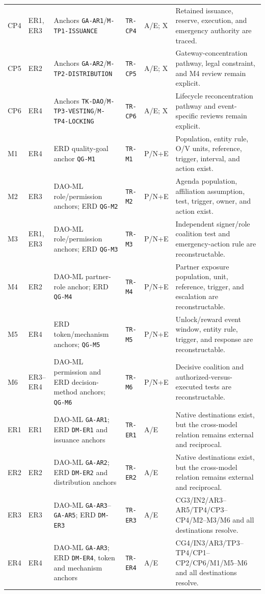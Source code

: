 \documentclass[10pt]{article}
\begin{document}
\begin{landscape}
{\begin{longtable}{@{}p{.035\linewidth}p{.07\linewidth}p{.245\linewidth}p{.105\linewidth}p{.09\linewidth}p{.31\linewidth}@{}}
CP4 & ER1, ER3 & Anchors \texttt{GA-AR1}/\texttt{M-TP1-ISSUANCE} & \texttt{TR-CP4} & A/E; X & Retained issuance, reserve, execution, and emergency authority are traced. \\
CP5 & ER2 & Anchors \texttt{GA-AR2}/\texttt{M-TP2-DISTRIBUTION} & \texttt{TR-CP5} & A/E; X & Gateway-concentration pathway, legal constraint, and M4 review remain explicit. \\
CP6 & ER4 & Anchors \texttt{TK-DAO}/\texttt{M-TP3-VESTING}/\texttt{M-TP4-LOCKING} & \texttt{TR-CP6} & A/E; X & Lifecycle reconcentration pathway and event-specific reviews remain explicit. \\
M1 & ER4 & ERD quality-goal anchor \texttt{QG-M1} & \texttt{TR-M1} & P/N+E & Population, entity rule, O/V units, reference, trigger, interval, and action exist. \\
M2 & ER3 & DAO-ML role/permission anchors; ERD \texttt{QG-M2} & \texttt{TR-M2} & P/N+E & Agenda population, affiliation assumption, test, trigger, owner, and action exist. \\
M3 & ER1, ER3 & DAO-ML role/permission anchors; ERD \texttt{QG-M3} & \texttt{TR-M3} & P/N+E & Independent signer/role coalition test and emergency-action rule are reconstructable. \\
M4 & ER2 & DAO-ML partner-role anchor; ERD \texttt{QG-M4} & \texttt{TR-M4} & P/N+E & Partner exposure population, unit, reference, trigger, and escalation are reconstructable. \\
M5 & ER4 & ERD token/mechanism anchors; \texttt{QG-M5} & \texttt{TR-M5} & P/N+E & Unlock/reward event window, entity rule, trigger, and response are reconstructable. \\
M6 & ER3--ER4 & DAO-ML permission and ERD decision-method anchors; \texttt{QG-M6} & \texttt{TR-M6} & P/N+E & Decisive coalition and authorized-versus-executed tests are reconstructable. \\
ER1 & ER1 & DAO-ML \texttt{GA-AR1}; ERD \texttt{DM-ER1} and issuance anchors & \texttt{TR-ER1} & A/E & Native destinations exist, but the cross-model relation remains external and reciprocal. \\
ER2 & ER2 & DAO-ML \texttt{GA-AR2}; ERD \texttt{DM-ER2} and distribution anchors & \texttt{TR-ER2} & A/E & Native destinations exist, but the cross-model relation remains external and reciprocal. \\
ER3 & ER3 & DAO-ML \texttt{GA-AR3}--\texttt{GA-AR5}; ERD \texttt{DM-ER3} & \texttt{TR-ER3} & A/E & CG3/IN2/AR3--AR5/TP4/CP3--CP4/M2--M3/M6 and all destinations resolve. \\
ER4 & ER4 & DAO-ML \texttt{GA-AR3}; ERD \texttt{DM-ER4}, token and mechanism anchors & \texttt{TR-ER4} & A/E & CG4/IN3/AR3/TP3--TP4/CP1--CP2/CP6/M1/M5--M6 and all destinations resolve. \\
\bottomrule
\end{longtable}
}
\end{landscape}
\end{document}
